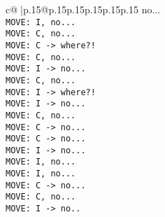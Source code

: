\documentclass{article}
\begin{document}
{\begin{supertabular}{c@{$\;$}|p{.15\linewidth}@{}p{.15\linewidth}p{.15\linewidth}p{.15\linewidth}p{.15\linewidth}p{.15\linewidth}}
{{{ no...\\ \tt  MOVE: I, no...\\ \tt  MOVE: C, no...\\ \tt  MOVE: C -> where?!\\ \tt  MOVE: C, no...\\ \tt  MOVE: I -> no...\\ \tt  MOVE: C, no...\\ \tt  MOVE: I -> where?!\\ \tt  MOVE: I -> no...\\ \tt  MOVE: C, no...\\ \tt  MOVE: C -> no...\\ \tt  MOVE: C -> no...\\ \tt  MOVE: I -> no...\\ \tt  MOVE: I, no...\\ \tt  MOVE: I, no...\\ \tt  MOVE: C -> no...\\ \tt  MOVE: C, no...\\ \tt  MOVE: I -> no..}}}
\end{supertabular}}
\end{document}
